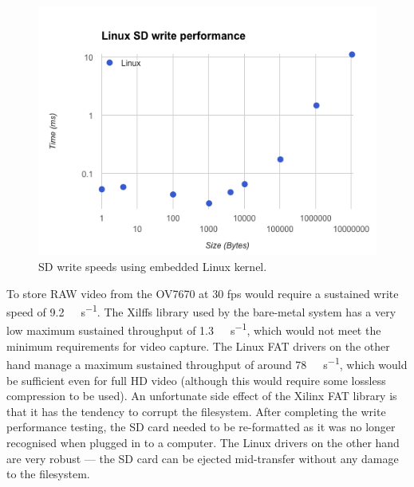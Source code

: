 \begin{figure}
  \centering
  \includegraphics[width=1\textwidth]{./img/linux_write_graph.png}
  \caption{SD write speeds using embedded Linux kernel.}
  \label{fig:linux_write_graph}
\end{figure}


To store RAW video from the OV7670 at 30 \gls{fps} would require a sustained write speed of \SI{9.2}{\mega\byte\per\second}. The Xilffs library used by the bare-metal system has a very low maximum sustained throughput of \SI{1.3}{\mega\byte\per\second}, which would not meet the minimum requirements for video capture. The Linux FAT drivers on the other hand manage a maximum sustained throughput of around \SI{78}{\mega\byte\per\second}, which would be sufficient even for full HD video (although this would require some lossless compression to be used). An unfortunate side effect of the Xilinx FAT library is that it has the tendency to corrupt the filesystem. After completing the write performance testing, the SD card needed to be re-formatted as it was no longer recognised when plugged in to a computer. The Linux drivers on the other hand are very robust --- the SD card can be ejected mid-transfer without any damage to the filesystem.
